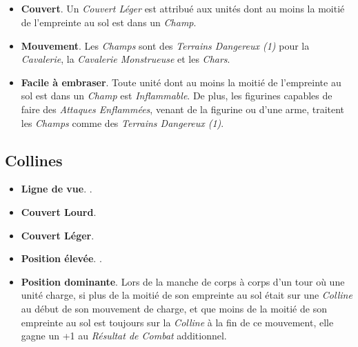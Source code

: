 \subsection{}

\begin{itemize}[label={-}]
\item \textbf{Couvert}. Un \emph{Couvert Léger} est attribué aux unités dont au moins la moitié de l'empreinte au sol est dans un \emph{Champ}.
\item \textbf{Mouvement}. Les \emph{Champs} sont des \emph{Terrains Dangereux (1)} pour la \emph{Cavalerie}, la \emph{Cavalerie Monstrueuse} et les \emph{Chars}.
\item \textbf{Facile à embraser}. Toute unité dont au moins la moitié de l'empreinte au sol est dans un \emph{Champ} est \emph{Inflammable}. De plus, les figurines capables de faire des \emph{Attaques Enflammées}, venant de la figurine ou d'une arme, traitent les \emph{Champs} comme des \emph{Terrains Dangereux (1)}.
\end{itemize}

\subsection{Collines}

\begin{itemize}[label={-}]
\item \textbf{Ligne de vue}. .
\item \textbf{Couvert Lourd}. 
\item \textbf{Couvert Léger}. 
\item \textbf{Position élevée}. .
\item \textbf{Position dominante}. Lors de la manche de corps à corps d'un tour où une unité charge, si plus de la moitié de son empreinte au sol était sur une \emph{Colline} au début de son mouvement de charge, et que moins de la moitié de son empreinte au sol est toujours sur la \emph{Colline} à la fin de ce mouvement, elle gagne un +1 au \emph{Résultat de Combat} additionnel.
\end{itemize}

